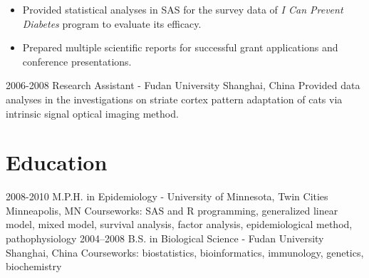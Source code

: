 \begin{entrylist}
{    \begin{itemize}
      \item Provided statistical analyses in SAS for the survey data of \textit{I Can Prevent Diabetes} program to evaluate its efficacy.
      \item Prepared multiple scientific reports for successful grant applications and conference presentations.
    \end{itemize}
    }
  \entry
    {2006-2008}
    {Research Assistant - Fudan University}
    {Shanghai, China}
    {Provided data analyses in the investigations on striate cortex pattern adaptation of cats via intrinsic signal optical imaging method.}
\end{entrylist}

\section{Education}

\begin{entrylist}
  \entry
    {2008-2010}
    {M.P.H. in Epidemiology - University of Minnesota, Twin Cities}
    {Minneapolis, MN}
    {Courseworks: SAS and R programming, generalized linear model, mixed model, survival analysis, factor analysis, epidemiological method, pathophysiology}
  \entry
    {2004–2008}
    {B.S. in Biological Science - Fudan University}
    {Shanghai, China}
    {Courseworks: biostatistics, bioinformatics, immunology, genetics, biochemistry}
\end{entrylist}

